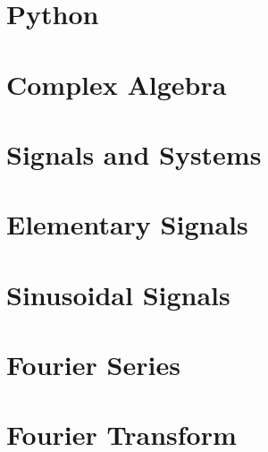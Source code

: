 \documentclass{tufte-book}
\begin{document}
\ifSpPython
\chapter{Python} 


 \ifSpExerciseSol
   
 \fi
\fi

\ifSpComplex
\chapter{Complex Algebra}


 \ifSpExerciseSol
 
 \fi
\fi

\ifSpSigSys
\chapter{Signals and Systems}


 \ifSpExerciseSol
 
 \fi
\fi

\ifSpElSig
\chapter{Elementary Signals}


 \ifSpExerciseSol
 
 \fi
\fi

\ifSpSin
\chapter{Sinusoidal Signals}


 \ifSpExerciseSol
 
 \fi
\fi

\ifSpdB

\fi

\ifSpFourierSer
\chapter{Fourier Series}


 \ifSpExerciseSol
 
 \fi



\fi

\ifSpProgA

\fi

\ifSpFourierTra
\chapter{Fourier Transform}


 \ifSpExerciseSol
 
 \fi


\fi
\end{document}
